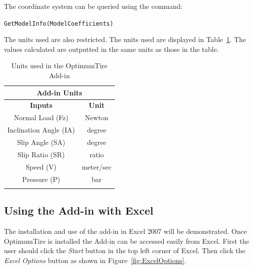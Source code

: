 The coordinate system can be queried using the command:
\begin{center}
\texttt{GetModelInfo(ModelCoefficients)}
\end{center}

The units used are also restricted. The units used are displayed in Table~\ref{tbl:AddinUnits}. The values calculated are outputted in the same units as those in the table.

\begin{center}
\begin{longtable}{|c|c|}
			
			\hline
			\multicolumn{2}{|c|}{\cellcolor{tblue}\textbf{Add-in Units}} \\ \hline
			\rowcolor{ttblue}\textbf{Inputs} & \textbf{Unit} \\ \hline
			Normal Load (Fz) &Newton \\ \hline
			Inclination Angle (IA)	&degree \\ \hline
			Slip Angle (SA)	&degree \\ \hline
			Slip Ratio (SR)	&ratio \\ \hline
			Speed (V)	&meter/sec \\ \hline
			Pressure (P)	&bar \\ \hline
			\hline
											
			\caption{Units used in the OptimumTire Add-in}
			\label{tbl:AddinUnits}
			
\end{longtable}
\end{center}

\subsection{Using the Add-in with Excel}
\label{sec:OptimumTAddin:Excel}

The installation and use of the add-in in Excel 2007 will be demonstrated. Once OptimumTire is installed the Add-in can be accessed easily from Excel. First the user should click the \textit{Start} button in the top left corner of Excel. Then click the \textit{Excel Options} button as shown in Figure~\ref{fig:ExcelOptions}.

